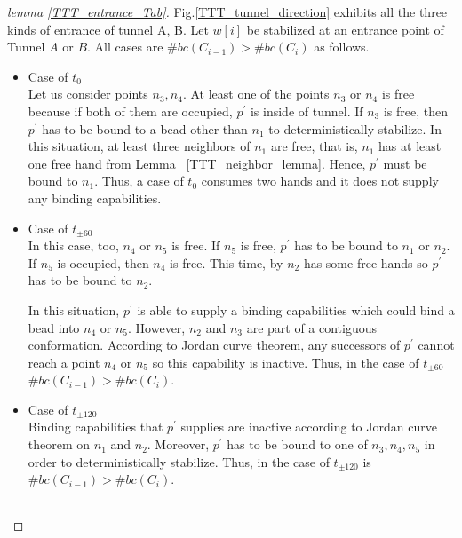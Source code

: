 \begin{proof}[lemma \ref{TTT_entrance_Tab}]
Fig.\ref{TTT_tunnel_direction} exhibits all the three kinds of entrance of tunnel A, B.
Let $w[i]$ be stabilized at an entrance point of Tunnel $A$ or $B$.
All cases are $\#bc(C_{i-1}) > \#bc(C_{i})$ as follows.


\begin{itemize}
\item{Case of $t_0$}\\
  Let us consider points $n_3,n_4$. At least one of the points $n_3$ or $n_4$ is free because if both of them are occupied, $p^\prime$ is inside of tunnel. If $n_3$ is free, then $p^\prime$ has to be bound to a bead other than $n_1$ to deterministically stabilize. In this situation, at least three neighbors of $n_1$ are free, that is, $n_1$ has at least one free hand from Lemma~ \ref{TTT_neighbor_lemma}. Hence, $p^\prime$ must be bound to $n_1$. Thus, a case of $t_0$ consumes two hands and it does not supply any binding capabilities.

\item{Case of $t_{\pm 60}$}\\
  In this case, too, $n_4$ or $n_5$ is free. If $n_5$ is free, $p^\prime$ has to be bound to $n_1$ or $n_2$. If $n_5$ is occupied, then $n_4$ is free. This time, by $n_2$ has some free hands so $p^\prime$ has to be bound to $n_2$.
  

  In this situation, $p^\prime$ is able to supply a binding capabilities which could bind a bead into $n_4$ or $n_5$. However, $n_2$ and $n_3$ are part of a contiguous conformation. According to Jordan curve theorem, any successors of $p^\prime$ cannot reach a point $n_4$ or $n_5$ so this capability is inactive. Thus, in the case of $t_{\pm 60}$ $\#bc(C_{i-1}) > \#bc(C_{i})$.

\item{Case of $t_{\pm 120}$}\\
  Binding capabilities that $p^\prime$ supplies are inactive according to Jordan curve theorem on $n_1$ and $n_2$. Moreover, $p^\prime$ has to be bound to one of $n_3, n_4, n_5$ in order to deterministically stabilize.
Thus, in the case of $t_{\pm 120}$ is $\#bc(C_{i-1}) > \#bc(C_{i})$.
  
\end{itemize}

\begin{figure}
  \begin{center}
    \begin{tabular}{ccc}
    

\end{tabular}
\end{center}
\end{figure}
\end{proof}
